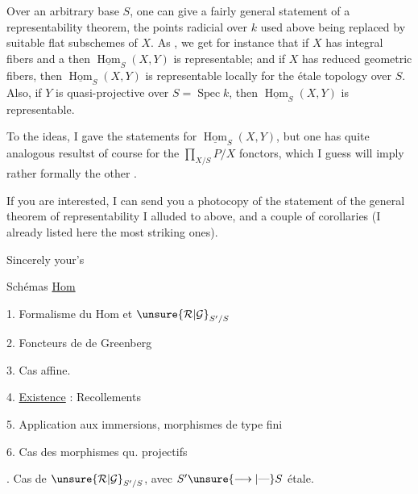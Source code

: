 Over an arbitrary base $S$, one can give a fairly general statement of a representability theorem, the points radicial over $k$ used above being replaced by suitable flat subschemes of $X$. As  , we get for instance that if $X$ has integral  fibers and a   then $\underline{\operatorname{Hom}}_S(X,Y)$ is representable; and if $X$ has reduced geometric fibers, then $\underline{\operatorname{Hom}}_S(X,Y)$ is representable locally for the étale topology over $S$. Also, if $Y$ is quasi-projective over $S=\operatorname{Spec}k$, then $\underline{\operatorname{Hom}}_S(X,Y)$ is representable.

To  the ideas, I gave the statements for $\underline{\operatorname{Hom}}_S(X,Y)$, but one has quite analogous resultst of course for the $\prod_{X/S}P/X$ fonctors, which I guess will imply rather formally the other .

If you are interested, I can send you a photocopy of the statement of the general theorem of representability I alluded to\unsure{,} above, and a couple of corollaries (I already listed here the most striking ones).

Sincerely your's

Schémas \uline{Hom}  

1. Formalisme du Hom et $\unsure{\mathcal R|\mathcal G}_{S'/S}$

2.   Foncteurs de   de Greenberg

3.  Cas affine. 

4. \uline{Existence}  : Recollements 

5. Application aux immersions, morphismes de type fini 

6. Cas des morphismes qu. projectifs 

.  Cas de $\unsure{\mathcal R|\mathcal G}_{S'/S}$, avec $S'\unsure{\longrightarrow|\text{—}}S$ étale.


